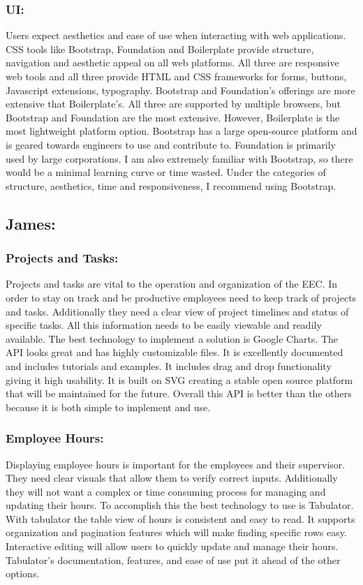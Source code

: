 \documentclass[letterpaper,10pt,titlepage,journal,compsoc,draftclsnofoot,onecolumn]{IEEEtran}
\newcommand\tab[1][1cm]{\hspace*{#1}}
\begin{document}
\subsubsection{UI:}
\tab Users expect aesthetics and ease of use when interacting with web applications. CSS tools like Bootstrap, Foundation and Boilerplate provide structure, navigation and aesthetic appeal on all web platforms. All three are responsive web tools and all three provide HTML and CSS frameworks for forms, buttons, Javascript extensions, typography. Bootstrap and Foundation’s offerings are more extensive that Boilerplate’s. All three are supported by multiple browsers, but Bootstrap and Foundation are the most extensive. However, Boilerplate is the most lightweight platform option. Bootstrap has a large open-source platform and is geared towards engineers to use and contribute to. Foundation is primarily used by large corporations. I am also extremely familiar with Bootstrap, so there would be a minimal learning curve or time wasted. Under the categories of structure, aesthetics, time and responsiveness, I recommend using Bootstrap. \newline	

\subsection{James:}
\subsubsection{Projects and Tasks:}
\tab Projects and tasks are vital to the operation and organization of the EEC. In order to stay on track and be productive employees need to keep track of projects and tasks. Additionally they need a clear view of project timelines and status of specific tasks. All this information needs to be easily viewable and readily available. The best technology to implement a solution is Google Charts. The API looks great and has highly customizable files. It is excellently documented and includes tutorials and examples. It includes drag and drop functionality giving it high usability. It is built on SVG creating a stable open source platform that will be maintained for the future. Overall this API is better than the others because it is both simple to implement and use. \newline

\subsubsection{Employee Hours:}
\tab Displaying employee hours is important for the employees and their supervisor. They need clear visuals that allow them to verify correct inputs. Additionally they will not want a complex or time consuming process for managing and updating their hours. To accomplish this the best technology to use is Tabulator. With tabulator the table view of hours is consistent and easy to read. It supports organization and pagination features which will make finding specific rows easy. Interactive editing will allow users to quickly update and manage their hours. Tabulator’s documentation, features, and ease of use put it ahead of the other options. \newline
\end{document}
